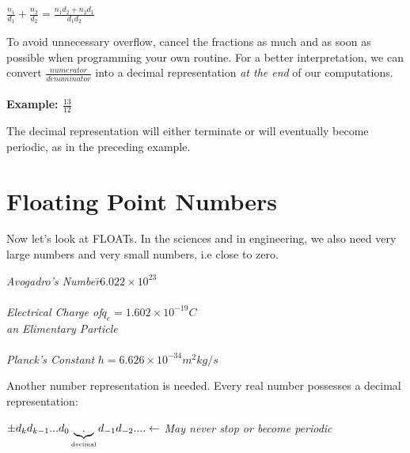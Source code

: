 \documentclass[a4paper,12pt]{report}
\begin{document}
\begin{center}
	\Large{$\frac{n_1}{d_1}+\frac{n_2}{d_2}=\frac{n_1d_2+n_2d_1}{d_1d_2}$}
\end{center}

	To avoid unnecessary overflow, cancel the fractions as much and as soon as possible when 
	programming your own routine. For a better interpretation, we can convert
	$\frac{numerator}{denominator}$ into a decimal representation \textit{at the end} of our 
	computations.\\ \\

	\noindent \textbf{Example: \Large{$\frac{13}{12}$}}\\

\begin{center}
\end{center}

	The decimal representation will either terminate or will eventually become periodic, as in the 
	preceding example.

\section{Floating Point Numbers}

	Now let's look at FLOATs. In the sciences and in engineering, we also need very large numbers 
	and very small numbers, i.e close to zero.

\begin{tabbing}
	\hspace*{2cm}\=\textit{Avogadro's Number}\hspace*{2cm}\=$6.022\times10^{23}$\\ \\
	\>\textit{Electrical Charge of}\>$q_e=1.602\times10^{-19}C$\\
	\> \textit{an Elimentary Particle}\\ \\
	\> \textit{Planck's Constant} \>$h=6.626\times10^{-34} m^2kg/s$
\end{tabbing}

	Another number representation is needed. Every real number possesses a decimal representation:

\begin{center}
	$\pm d_k d_{k-1} ... d_0 \underbrace{.}_{\text{\tiny{decimal}}} d_{-1} d_{-2} ....\leftarrow$
	\footnotesize{\textit{May never stop or become periodic}}
\end{center}
\end{document}
